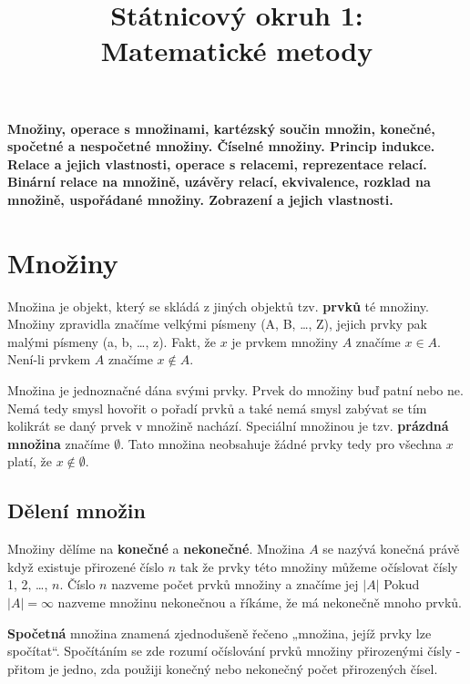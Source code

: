 \documentclass[12pt,a4paper]{article}
\begin{document}
\title{Státnicový okruh 1: \\ Matematické metody}
\maketitle
\newpage
\tableofcontents
\newpage
\textbf{Množiny, operace s množinami, kartézský součin množin, konečné, spočetné a nespočetné množiny. Číselné
množiny. Princip indukce. Relace a jejich vlastnosti, operace s relacemi, reprezentace relací. Binární relace na
množině, uzávěry relací, ekvivalence, rozklad na množině, uspořádané množiny. Zobrazení a jejich vlastnosti.}

\section{Množiny}
Množina je objekt, který se skládá z jiných objektů tzv. \textbf{prvků} té množiny. Množiny zpravidla značíme velkými písmeny (A, B, \dots, Z), jejich prvky pak malými písmeny (a, b, \dots, z). Fakt, že $x$ je prvkem množiny $A$ značíme $x \in A$. Není-li prvkem $A$ značíme $x \not\in A$.

Množina je jednoznačné dána svými prvky. Prvek do množiny buď patní nebo ne. Nemá tedy smysl hovořit o pořadí prvků a také nemá smysl zabývat se tím kolikrát se daný prvek v množině nachází.
Speciální množinou je tzv. \textbf{prázdná množina} značíme $\emptyset$. Tato množina neobsahuje žádné prvky tedy pro všechna $x$ platí, že $x \not\in \emptyset$.

\subsection{Dělení množin}
Množiny dělíme na \textbf{konečné} a \textbf{nekonečné}. Množina $A$ se nazývá konečná právě když existuje přirozené číslo $n$ tak že prvky této množiny můžeme očíslovat čísly 1, 2, \dots, $n$. Číslo $n$ nazveme počet prvků množiny a značíme jej $|A|$
Pokud $|A| = \infty$ nazveme množinu nekonečnou a říkáme, že má nekonečně mnoho prvků.

\textbf{Spočetná} množina znamená zjednodušeně řečeno „množina, jejíž prvky lze spočítat“. Spočítáním se zde rozumí očíslování prvků množiny přirozenými čísly - přitom je jedno, zda použiji konečný nebo nekonečný počet přirozených čísel.
\end{document}
